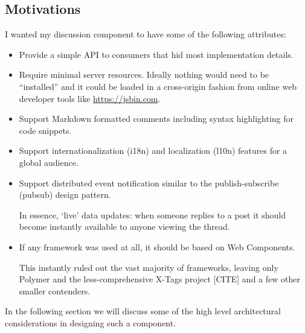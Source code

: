 \subsection{Motivations}

I wanted my discussion component to have some of the following attributes:

\begin{itemize}
\item Provide a simple API to consumers that hid most implementation details.

\item Require minimal server resources. Ideally nothing would need to be ``installed'' and it could be loaded in a cross-origin fashion from online web developer tools like \url{https://jsbin.com}.

\item Support Markdown formatted comments including syntax highlighting for code snippets.

\item Support internationalization (i18n) and localization (l10n) features for a global audience.

\item Support distributed event notification similar to the publish-subscribe (pubsub) design pattern. 

In essence, `live' data updates:
when someone replies to a post it should become instantly available to anyone viewing the thread.

\item If any framework was used at all, it should be based on Web Components. 


This instantly ruled out the vast majority of frameworks, 
leaving only Polymer and the less-comprehensive X-Tags project [CITE] and a few other smaller contenders.

\end{itemize}

In the following section we will discuss some of the high level architectural considerations in designing such a component.
